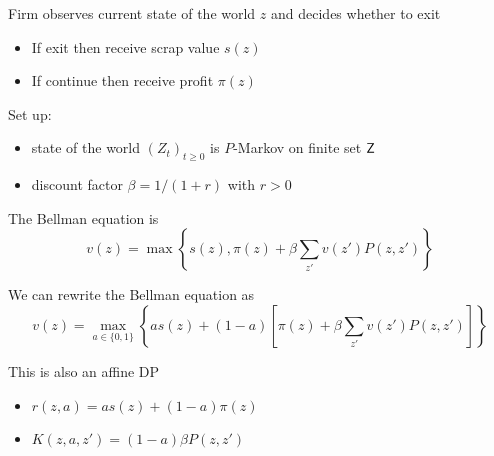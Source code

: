 \documentclass[dvipsnames]{beamer}
\begin{document}
\begin{frame}
    
    \Eg {}

    \medskip

    Firm observes current state of the world $z$ and decides whether to exit

    \begin{itemize}
        \item If exit then receive scrap value $s(z)$  
            \medskip
        \item If continue then receive profit $\pi(z)$
    \end{itemize}

    \medskip

    Set up:
    \begin{itemize}
        \item state of the world $(Z_t)_{t \geq 0}$ is $P$-Markov on finite set $\mathsf Z$ 
            \medskip
        \item discount factor $\beta = 1/(1+r)$ with $r > 0$
    \end{itemize}

\end{frame}

\begin{frame}
    
    The Bellman equation is
    \begin{equation*}
        v(z) =
        \max
        \left\{
            s(z) , \pi(z) + \beta \sum_{z'} v(z') P(z, z')
        \right\}
    \end{equation*}

    We can rewrite the Bellman equation as
    \begin{equation*}
        v(z) =
        \max_{a \in \{0,1\}}
        \left\{
             a s(z)
             + (1-a) \left[ \pi(z) + \beta \sum_{z'} v(z') P(z, z') \right]
        \right\}
    \end{equation*}
    \medskip

    This is also an affine DP

    \begin{itemize}
        \item $r(z, a) = a s(z) + (1-a)\pi(z)$
        \medskip
        \item $K(z, a, z') = (1 - a) \beta P(z, z')$
    \end{itemize}

\end{frame}
\end{document}
